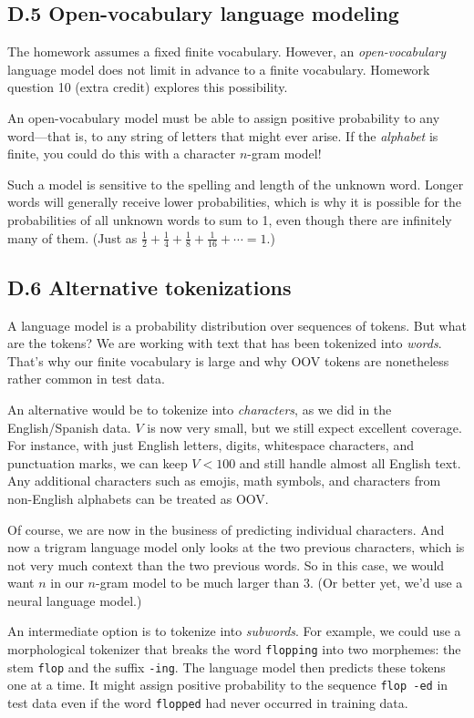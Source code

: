 \documentclass[12pt]{article}
\theoremstyle{plain}
\theoremstyle{definition}
\theoremstyle{remark}
\begin{document}
\subsection*{D.5 Open-vocabulary language modeling}

The homework assumes a fixed finite vocabulary. However, an \textit{open-vocabulary} language model does not limit in advance to a finite vocabulary. Homework question 10 (extra credit) explores this possibility.

An open-vocabulary model must be able to assign positive probability to any word—that is, to any string of letters that might ever arise. If the \textit{alphabet} is finite, you could do this with a character $n$-gram model!

Such a model is sensitive to the spelling and length of the unknown word. Longer words will generally receive lower probabilities, which is why it is possible for the probabilities of all unknown words to sum to 1, even though there are infinitely many of them. (Just as $\tfrac{1}{2} + \tfrac{1}{4} + \tfrac{1}{8} + \tfrac{1}{16} + \cdots = 1.$)

\subsection*{D.6 Alternative tokenizations}

A language model is a probability distribution over sequences of tokens. But what are the tokens? We are working with text that has been tokenized into \textit{words}. That’s why our finite vocabulary is large and why OOV tokens are nonetheless rather common in test data.

An alternative would be to tokenize into \textit{characters}, as we did in the English/Spanish data. $V$ is now very small, but we still expect excellent coverage. For instance, with just English letters, digits, whitespace characters, and punctuation marks, we can keep $V < 100$ and still handle almost all English text. Any additional characters such as emojis, math symbols, and characters from non-English alphabets can be treated as OOV.

Of course, we are now in the business of predicting individual characters. And now a trigram language model only looks at the two previous characters, which is not very much context than the two previous words. So in this case, we would want $n$ in our $n$-gram model to be much larger than 3. (Or better yet, we’d use a neural language model.)

An intermediate option is to tokenize into \textit{subwords}. For example, we could use a morphological tokenizer that breaks the word \texttt{flopping} into two morphemes: the stem \texttt{flop} and the suffix \texttt{-ing}. The language model then predicts these tokens one at a time. It might assign positive probability to the sequence \texttt{flop -ed} in test data even if the word \texttt{flopped} had never occurred in training data.
\end{document}

